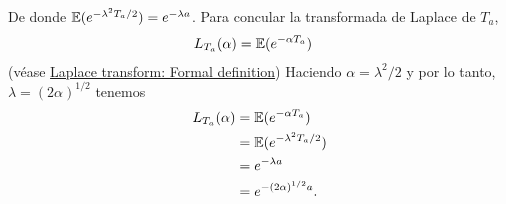 De donde $\mathbb{E}(e^{-\lambda^2 T_a/2}) = e^{-\lambda a}$. Para concular la transformada de Laplace de $T_a$, 
\begin{align}
    L_{T_a}(\alpha) &=  \mathbb{E}(e^{-\alpha T_a})
\end{align}
(véase \href{http://en.wikipedia.org/wiki/Laplace_transform#Formal_definition}{Laplace transform: Formal definition})
Haciendo $\alpha = \lambda^2/2$ y por lo tanto, $\lambda = (2\alpha)^{1/2}$ tenemos
\begin{align}
    L_{T_a}(\alpha) &=  \mathbb{E}(e^{-\alpha T_a})         \\
                    &=  \mathbb{E}(e^{-\lambda^2 T_a/2})    \\
                    &=  e^{-\lambda a}              \\
                    &=  e^{-(2\alpha)^{1/2} a}.
\end{align}
